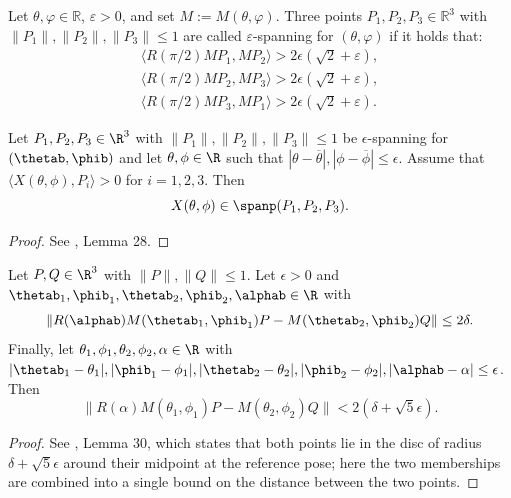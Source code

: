 \begin{definition}
  \label{def:eps-spanning}
  \leanok
  Let $\theta, \varphi \in \mathbb{R}$, $\varepsilon > 0$, and set $M := M(\theta, \varphi)$.
  Three points $P_1, P_2, P_3 \in \mathbb{R}^3$ with $\|P_1\|, \|P_2\|, \|P_3\| \leq 1$ are
  called $\varepsilon$-spanning for $(\theta, \varphi)$ if it holds that:
\begin{align*}
    \langle R(\pi/2) M P_1,M P_{2}\rangle > 2 \epsilon(\sqrt{2} + \varepsilon),\\
    \langle R(\pi/2) M P_2,M P_{3}\rangle > 2 \epsilon(\sqrt{2} + \varepsilon),\\
    \langle R(\pi/2) M P_3,M P_{1}\rangle > 2 \epsilon(\sqrt{2} + \varepsilon).
\end{align*}
\end{definition}


\begin{lemma} \label{lem:eps-spanning}
  \leanok
    Let $P_1, P_2, P_3 \in \R^3$ with $\|P_1\|,\|P_2\|,\|P_3\| \leq 1$ be $\epsilon$-spanning for $(\thetab, \phib)$ and let $\theta, \phi \in \R$ such that $|\theta - \overline{\theta}|, |\phi - \overline{\phi}| \leq \epsilon$. Assume that $\langle X(\theta, \phi), P_i \rangle > 0$ for $i=1,2,3$. Then
    \[
        X(\theta, \phi) \in \spanp(P_1, P_2, P_3).
    \]
\end{lemma}

\begin{proof}
\leanok
See \cite{polyhedron.without.rupert}, Lemma 28.
\end{proof}

\begin{lemma} \label{lem:inCirc}
  \leanok
    Let $P, Q \in \R^3$ with $\|P\|, \|Q\| \leq 1$. Let $\epsilon>0$ and $\thetab_1,\phib_1,\thetab_2,\phib_2,\alphab \in \R$ with
    \[
        \|R(\alphab) M(\thetab_1, \phib_1) P - M(\thetab_2, \phib_2) Q\| \leq 2\delta.
    \]
    Finally, let $\theta_1, \phi_1, \theta_2, \phi_2, \alpha \in \R$ with $|\thetab_1-\theta_1|, |\phib_1 - \phi_1|, |\thetab_2-\theta_2|, |\phib_2-\phi_2|, |\alphab - \alpha| \leq \epsilon$. Then
    \[
        \|R(\alpha)M(\theta_1, \phi_1) P - M(\theta_2, \phi_2) Q\| < 2(\delta + \sqrt{5} \epsilon).
    \]
\end{lemma}

\begin{proof}
\leanok
See \cite{polyhedron.without.rupert}, Lemma 30, which states that both points lie in the disc of radius $\delta + \sqrt{5}\epsilon$ around their midpoint at the reference pose; here the two memberships are combined into a single bound on the distance between the two points.
\end{proof}

